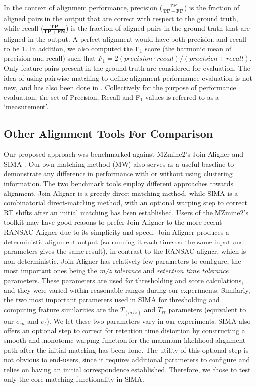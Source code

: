 In the context of alignment performance, precision ($\frac{\boldsymbol{TP}}{\boldsymbol{TP}+\boldsymbol{FP}}$) is the fraction of aligned pairs in the output that are correct with respect to the ground truth, while recall ($\frac{\boldsymbol{TP}}{\boldsymbol{TP}+\boldsymbol{FN}}$) is the fraction of aligned pairs in the ground truth that are aligned in the output. A perfect alignment would have both precision and recall to be 1. In addition, we also computed the F$_1$ score (the harmonic mean of precision and recall) such that $F_1 = 2(precision\cdot recall)/(precision + recall)$. Only feature pairs present in the ground truth are considered for evaluation. The idea of using pairwise matching to define alignment performance evaluation is not new, and has also been done in \cite{Wang2013}. Collectively for the purpose of performance evaluation, the set of Precision, Recall and F$_1$ values is referred to as a `measurement'.

\subsection{Other Alignment Tools For Comparison\label{sec:comp}}

Our proposed approach was benchmarked against MZmine2's Join Aligner \cite{Pluskal2010} and SIMA \cite{Voss2011a}. Our own matching method (MW) also serves as a useful baseline to demonstrate any difference in performance with or without using clustering information. The two benchmark tools employ different approaches towards alignment. Join Aligner is a greedy direct-matching method, while SIMA is a combinatorial direct-matching method, with an optional warping step to correct RT shifts after an initial matching has been established. Users of the MZmine2's toolkit may have good reasons to prefer Join Aligner to the more recent RANSAC Aligner due to its simplicity and speed. Join Aligner produces a deterministic alignment output (so running it each time on the same input and parameters gives the same result), in contrast to the RANSAC aligner, which is non-deterministic. Join Aligner has relatively few parameters to configure, the most important ones being the \textit{m/z tolerance} and \textit{retention time tolerance} parameters. These parameters are used for thresholding and score calculations, and they were varied within reasonable ranges during our experiments. Similarly, the two most important parameters used in SIMA for thresholding and computing feature similarities are the $T_{(m/z)}$ and $T_{rt}$ parameters (equivalent to our $\sigma_{m}$ and $\sigma_{t}$). We let these two parameters vary in our experiments. SIMA also offers an optional step to correct for retention time distortion by constructing a smooth and monotonic warping function for the maximum likelihood alignment path after the initial matching has been done. The utility of this optional step is not obvious to end-users, since it requires additional parameters to configure and relies on having an initial correspondence established. Therefore, we chose to test only the core matching functionality in SIMA.

